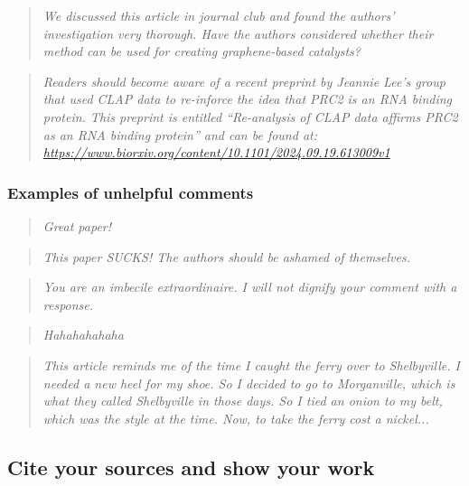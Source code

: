 \documentclass[letterpaper, 12pt]{article}
\begin{document}
\begin{quote}
    \textit{We discussed this article in journal club and found the authors' investigation very thorough. Have the authors considered whether their method can be used for creating graphene-based catalysts?}
\end{quote}

\begin{quote}
\textit{Readers should become aware of a recent preprint by Jeannie Lee's group that used CLAP data to re-inforce the idea that PRC2 is an RNA binding protein. This preprint is entitled ``Re-analysis of CLAP data affirms PRC2 as an RNA binding protein'' and can be found at: \href{https://www.biorxiv.org/content/10.1101/2024.09.19.613009v1}{https://www.biorxiv.org/content/10.1101/2024.09.19.613009v1}}
\end{quote}

\subsubsection*{Examples of unhelpful comments}

\begin{quote}
    \textit{Great paper!}
\end{quote}

\begin{quote}
    \textit{This paper SUCKS! The authors should be ashamed of themselves.}
\end{quote}

\begin{quote}
    \textit{You are an imbecile extraordinaire. I will not dignify your comment with a response.}
\end{quote}

\begin{quote}
    \textit{Hahahahahaha}
\end{quote}

\begin{quote}
    \textit{This article reminds me of the time I caught the ferry over to Shelbyville. I needed a new heel for my shoe. So I decided to go to Morganville, which is what they called Shelbyville in those days. So I tied an onion to my belt, which was the style at the time. Now, to take the ferry cost a nickel...}
\end{quote}

\subsection*{Cite your sources and show your work}
\end{document}
